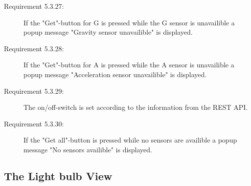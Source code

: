 \documentclass[a4paper]{article}
\begin{document}
\begin{description}
\item[Requirement 5.3.27:] If the "Get"-button for G is pressed while the G sensor is unavailible a popup message "Gravity sensor unavailible" is displayed.

\item[Requirement 5.3.28:] If the "Get"-button for A is pressed while the A sensor is unavailible a popup message "Acceleration sensor unavailible" is displayed.

\item[Requirement 5.3.29:] The on/off-switch is set according to the information from the REST API.

\item[Requirement 5.3.30:] If the "Get all"-button is pressed while no sensors are availible a popup message "No sensors availible" is displayed.

\end{description}


\subsection{The Light bulb View}
\end{document}
